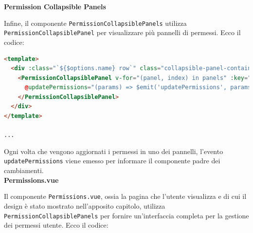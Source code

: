 \documentclass[a4paper, 12pt]{book}
\begin{document}
\textbf{Permission Collapsible Panels}

Infine, il componente \texttt{PermissionCollapsiblePanels} utilizza \\ \texttt{PermissionCollapsiblePanel} per
visualizzare più pannelli di permessi. Ecco il codice:\\

\begin{lstlisting}[language=HTML, caption=Implementazione di PermissionCollapsiblePanels]
<template>
  <div :class="`${$options.name} row`" class="collapsible-panel-container">
    <PermissionCollapsiblePanel v-for="(panel, index) in panels" :key="`${index}panels`" :panel="panel"
      @updatePermissions="(params) => $emit('updatePermissions', params)" class="col-md-6 col-12">
    </PermissionCollapsiblePanel>
  </div>
</template>

...
\end{lstlisting}

Ogni volta che vengono aggiornati i permessi in uno dei pannelli, l'evento \texttt{updatePermissions} viene
emesso per informare il componente padre dei cambiamenti.\\

\textbf{Permissions.vue}

Il componente \texttt{Permissions.vue}, ossia la pagina che l'utente visualizza e di cui il design è stato mostrato
nell'apposito capitolo, utilizza \texttt{PermissionCollapsiblePanels} per fornire un'interfaccia completa per
la gestione dei permessi utente. Ecco il codice:\\
\end{document}
